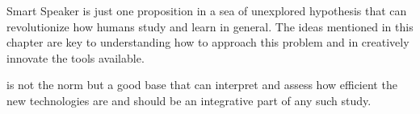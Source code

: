 Smart Speaker is just one proposition in a sea of unexplored hypothesis that can revolutionize 
how humans study and learn in general. The ideas mentioned in this chapter are key to understanding 
how to approach this problem and in creatively innovate the tools available.

 is not the norm but a good base that can interpret and assess how efficient 
the new technologies are and should be an integrative part of any such study. 